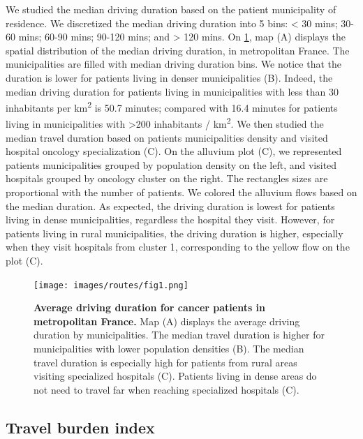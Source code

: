 We studied the median driving duration based on the patient municipality of
residence. We discretized the median driving duration into 5 bins: < 30 mins;
30-60 mins; 60-90 mins; 90-120 mins; and > 120 mins. On
\cref{fig:routes-duration-france}, map (A) displays the spatial distribution
of the median driving duration, in metropolitan France. The municipalities
are filled with median driving duration bins. We notice that the duration is
lower for patients living in denser municipalities (B). Indeed, the median
driving duration for patients living in municipalities with less than 30
inhabitants per km\textsuperscript{2} is 50.7 minutes; compared with
16.4 minutes for patients living in municipalities with
>200 inhabitants / km\textsuperscript{2}. We then studied the median travel
duration based on patients municipalities density and visited hospital oncology
specialization (C). On the alluvium plot (C), we represented patients
municipalities grouped by population density on the left, and visited hospitals
grouped by oncology cluster on the right. The rectangles sizes are proportional
with the number of patients. We colored the alluvium flows based on the median
duration. As expected, the driving duration is lowest for patients living in
dense municipalities, regardless the hospital they visit. However, for patients
living in rural municipalities, the driving duration is higher, especially when
they visit hospitals from cluster 1, corresponding to the yellow flow on the
plot (C).

\begin{figure}[h!]
    \texttt{[image: images/routes/fig1.png]}
    \centering
    \caption{ \textbf{Average driving duration for cancer patients in
            metropolitan France.} Map (A) displays the average driving duration by
        municipalities. The median travel duration is higher for municipalities
        with lower population densities (B). The median travel duration is
        especially high for patients from rural areas visiting specialized
        hospitals (C). Patients living in dense areas do not need to travel far
        when reaching specialized hospitals (C). }
    \label{fig:routes-duration-france}
\end{figure}

\subsection{Travel burden index}

